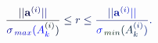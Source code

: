 \documentclass[12pt]{article}
\begin{document}
\makeatletter
\renewcommand*{\@textcolor}[3]{%
  \protect\leavevmode
  \begingroup
    \color#1{#2}#3%
  \endgroup
}
\makeatother
\begin{displaymath}
\mathcolor[RGB]{0,0,15}{\frac { \mathcolor[RGB]{0,0,30}{|} \mathcolor[RGB]{0,0,45}{|} \mathbf { \mathcolor[RGB]{0,0,60}{a} } ^ { \mathcolor[RGB]{0,0,75}{(} \mathcolor[RGB]{0,0,90}{i} \mathcolor[RGB]{0,0,105}{)} } \mathcolor[RGB]{0,0,120}{|} \mathcolor[RGB]{0,0,135}{|} } { \mathcolor[RGB]{0,0,150}{\sigma} _ { \mathcolor[RGB]{0,0,165}{\operatorname*} { \mathcolor[RGB]{0,0,180}{m} \mathcolor[RGB]{0,0,195}{a} \mathcolor[RGB]{0,0,210}{x} } } \mathcolor[RGB]{0,0,225}{(} \mathcolor[RGB]{0,0,240}{A} _ { \mathcolor[RGB]{0,0,255}{k} } ^ { \mathcolor[RGB]{0,15,0}{(} \mathcolor[RGB]{0,15,15}{i} \mathcolor[RGB]{0,15,30}{)} } \mathcolor[RGB]{0,15,45}{)} } } \mathcolor[RGB]{0,15,60}{\leq} \mathcolor[RGB]{0,15,75}{r} \mathcolor[RGB]{0,15,90}{\leq} \mathcolor[RGB]{0,15,105}{\frac { \mathcolor[RGB]{0,15,120}{|} \mathcolor[RGB]{0,15,135}{|} \mathbf { \mathcolor[RGB]{0,15,150}{a} } ^ { \mathcolor[RGB]{0,15,165}{(} \mathcolor[RGB]{0,15,180}{i} \mathcolor[RGB]{0,15,195}{)} } \mathcolor[RGB]{0,15,210}{|} \mathcolor[RGB]{0,15,225}{|} } { \mathcolor[RGB]{0,15,240}{\sigma} _ { \mathcolor[RGB]{0,15,255}{\operatorname*} { \mathcolor[RGB]{0,30,0}{m} \mathcolor[RGB]{0,30,15}{i} \mathcolor[RGB]{0,30,30}{n} } } \mathcolor[RGB]{0,30,45}{(} \mathcolor[RGB]{0,30,60}{A} _ { \mathcolor[RGB]{0,30,75}{k} } ^ { \mathcolor[RGB]{0,30,90}{(} \mathcolor[RGB]{0,30,105}{i} \mathcolor[RGB]{0,30,120}{)} } \mathcolor[RGB]{0,30,135}{)} } } \mathcolor[RGB]{0,30,150}{.}
\end{displaymath}
\end{document}
